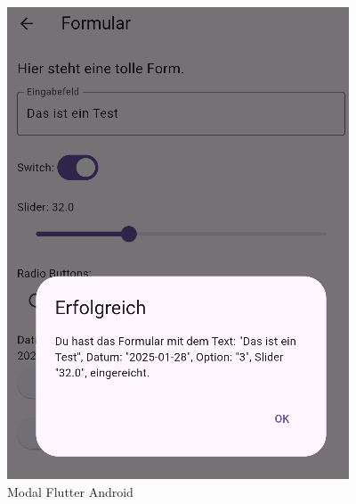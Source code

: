 \begin{figure}[H]
    \begin{minipage}{0.45\textwidth}
        \centering
        \includegraphics[width=\linewidth]{images/form/android/flutter/modal.png}
        \caption{Modal Flutter Android}
    \end{minipage}
    \hfill
    \begin{minipage}{0.45\textwidth}
        \centering

\end{minipage}
\end{figure}
